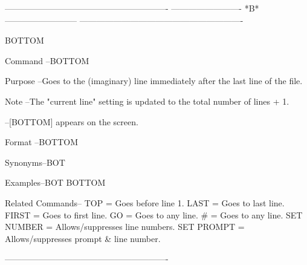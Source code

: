  
----------------------------------------------------------
-------------------------  *B*  --------------------------
----------------------------------------------------------
 
BOTTOM
 
Command --BOTTOM
 
Purpose --Goes to the (imaginary) line immediately
          after the last line of the file.
 
Note    --The "current line" setting is updated
          to the     total number of lines + 1.
 
        --[BOTTOM]    appears on the screen.
 
Format  --BOTTOM
 
Synonyms--BOT
 
Examples--BOT
          BOTTOM
 
Related Commands--
          TOP             = Goes before line 1.
          LAST            = Goes to last line.
          FIRST           = Goes to first line.
          GO              = Goes to any line.
          #               = Goes to any line.
          SET NUMBER      = Allows/suppresses line numbers.
          SET PROMPT      = Allows/suppresses prompt & line number.
 
----------------------------------------------------------
 
 
 
 
 
 
 
 
 
 
 
 
 
 
 
 
 
 
 
 
 
 
 
 
 
 
 
 
 
 
 
 
 
 
 
 
 
 
 
 
 
 
 
 
 
 
 
 
 
 
 
 
 
 
 
 
 
